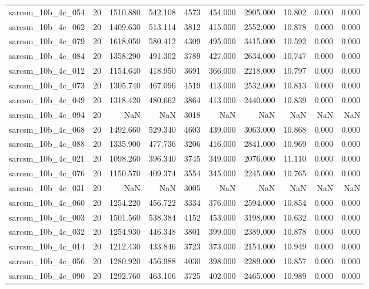 \begin{tabular}{lrrrrrrrrr}
sarcsm\_10b\_4c\_054 & 20 & 1510.880 & 542.108 & 4573 & 454.000 & 2905.000 & 10.802 & 0.000 & 0.000 \\
sarcsm\_10b\_4c\_062 & 20 & 1409.630 & 513.114 & 3812 & 415.000 & 2552.000 & 10.878 & 0.000 & 0.000 \\
sarcsm\_10b\_4c\_079 & 20 & 1618.050 & 580.412 & 4309 & 495.000 & 3415.000 & 10.592 & 0.000 & 0.000 \\
sarcsm\_10b\_4c\_084 & 20 & 1358.290 & 491.302 & 3789 & 427.000 & 2634.000 & 10.747 & 0.000 & 0.000 \\
sarcsm\_10b\_4c\_012 & 20 & 1154.640 & 418.950 & 3691 & 366.000 & 2218.000 & 10.797 & 0.000 & 0.000 \\
sarcsm\_10b\_4c\_073 & 20 & 1305.740 & 467.096 & 4519 & 413.000 & 2532.000 & 10.813 & 0.000 & 0.000 \\
sarcsm\_10b\_4c\_049 & 20 & 1318.420 & 480.662 & 3864 & 413.000 & 2440.000 & 10.839 & 0.000 & 0.000 \\
sarcsm\_10b\_4c\_094 & 20 & NaN & NaN & 3018 & NaN & NaN & NaN & NaN & NaN \\
sarcsm\_10b\_4c\_068 & 20 & 1492.660 & 529.340 & 4603 & 439.000 & 3063.000 & 10.868 & 0.000 & 0.000 \\
sarcsm\_10b\_4c\_088 & 20 & 1335.900 & 477.736 & 3206 & 416.000 & 2841.000 & 10.969 & 0.000 & 0.000 \\
sarcsm\_10b\_4c\_021 & 20 & 1098.260 & 396.340 & 3745 & 349.000 & 2076.000 & 11.110 & 0.000 & 0.000 \\
sarcsm\_10b\_4c\_076 & 20 & 1150.570 & 409.374 & 3554 & 345.000 & 2245.000 & 10.765 & 0.000 & 0.000 \\
sarcsm\_10b\_4c\_031 & 20 & NaN & NaN & 3005 & NaN & NaN & NaN & NaN & NaN \\
sarcsm\_10b\_4c\_060 & 20 & 1254.220 & 456.722 & 3334 & 376.000 & 2594.000 & 10.854 & 0.000 & 0.000 \\
sarcsm\_10b\_4c\_003 & 20 & 1501.560 & 538.384 & 4152 & 453.000 & 3198.000 & 10.632 & 0.000 & 0.000 \\
sarcsm\_10b\_4c\_032 & 20 & 1254.930 & 446.348 & 3801 & 399.000 & 2389.000 & 10.878 & 0.000 & 0.000 \\
sarcsm\_10b\_4c\_014 & 20 & 1212.430 & 433.846 & 3723 & 373.000 & 2154.000 & 10.949 & 0.000 & 0.000 \\
sarcsm\_10b\_4c\_056 & 20 & 1280.920 & 456.988 & 4030 & 398.000 & 2289.000 & 10.857 & 0.000 & 0.000 \\
sarcsm\_10b\_4c\_090 & 20 & 1292.760 & 463.106 & 3725 & 402.000 & 2465.000 & 10.989 & 0.000 & 0.000 \\

\end{tabular}

